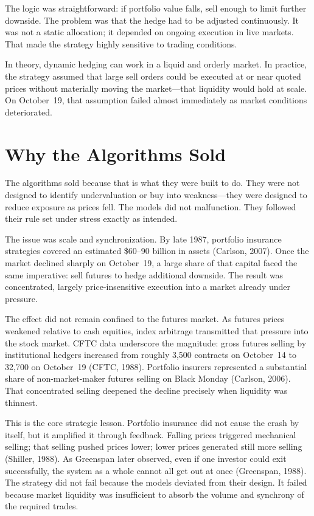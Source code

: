 \documentclass[12pt, a4paper]{article}
\begin{document}
The logic was straightforward: if portfolio value falls, sell enough to limit further
downside. The problem was that the hedge had to be adjusted continuously. It was not a
static allocation; it depended on ongoing execution in live markets. That made the
strategy highly sensitive to trading conditions.

In theory, dynamic hedging can work in a liquid and orderly market. In practice, the
strategy assumed that large sell orders could be executed at or near quoted prices
without materially moving the market---that liquidity would hold at scale.
On October~19, that assumption failed almost immediately as market conditions deteriorated.

\section{Why the Algorithms Sold}

The algorithms sold because that is what they were built to do. They were not designed
to identify undervaluation or buy into weakness---they were designed to reduce exposure
as prices fell. The models did not malfunction. They followed their rule set under stress
exactly as intended.

The issue was scale and synchronization. By late 1987, portfolio insurance strategies
covered an estimated \$60--90 billion in assets (Carlson, 2007). Once the market declined
sharply on October~19, a large share of that capital faced the same imperative: sell
futures to hedge additional downside. The result was concentrated, largely price-insensitive
execution into a market already under pressure.

The effect did not remain confined to the futures market. As futures prices weakened
relative to cash equities, index arbitrage transmitted that pressure into the stock
market. CFTC data underscore the magnitude: gross futures selling by institutional
hedgers increased from roughly 3,500 contracts on October~14 to 32,700 on October~19
(CFTC, 1988). Portfolio insurers represented a substantial share of non-market-maker
futures selling on Black Monday (Carlson, 2006). That concentrated selling deepened
the decline precisely when liquidity was thinnest.

This is the core strategic lesson. Portfolio insurance did not cause the crash by itself,
but it amplified it through feedback. Falling prices triggered mechanical selling; that
selling pushed prices lower; lower prices generated still more selling (Shiller, 1988).
As Greenspan later observed, even if one investor could exit successfully, the system as
a whole cannot all get out at once (Greenspan, 1988). The strategy did not fail because the models deviated from their design. It failed
because market liquidity was insufficient to absorb the volume and synchrony of the
required trades.
\end{document}
